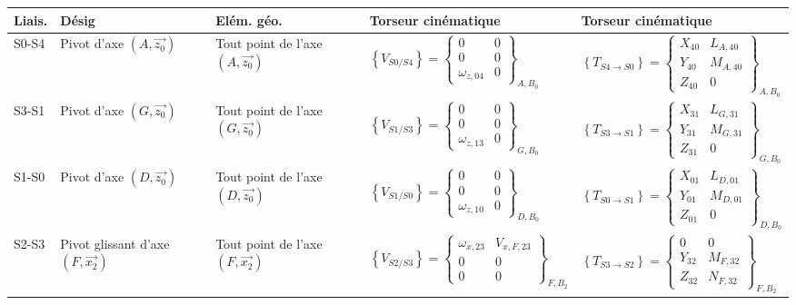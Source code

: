 {\begin{center}
\begin{tabular}{|m{0.5cm}|m{1.7cm}|m{2cm}|m{5.8cm}|m{5.5cm}|}
\hline
\end{tabular}
\end{center}}{\begin{center}
\begin{tabular}{|m{0.5cm}|m{1.7cm}|m{2cm}|m{5.8cm}|m{5.5cm}|}
\hline
Liais. & Désig & Elém. géo. & Torseur cinématique & Torseur cinématique \\ 
\hline
S0-S4 & Pivot d'axe $(A,\vec{z_0})$ & Tout point de l'axe  $(A,\vec{z_0})$ & \small$\left\{V_{S0/S4}\right\}=\left\{\begin{array}{cc}0 & 0\\0&0\\\omega_{z,04}&0\end{array}\right\}_{A,B_0}$ & \small$\left\{T_{S4\rightarrow S0}\right\}=\left\{\begin{array}{cc}X_{40} & L_{A,40}\\Y_{40}&M_{A,40}\\Z_{40}&0\end{array}\right\}_{A,B_0}$\\
\hline
S3-S1 & Pivot d'axe $(G,\vec{z_0})$ & Tout point de l'axe  $(G,\vec{z_0})$ & \small$\left\{V_{S1/S3}\right\}=\left\{\begin{array}{cc}0 & 0\\0&0\\\omega_{z,13}&0\end{array}\right\}_{G,B_0}$ & \small$\left\{T_{S3\rightarrow S1}\right\}=\left\{\begin{array}{cc}X_{31} & L_{G,31}\\Y_{31}&M_{G,31}\\Z_{31}&0\end{array}\right\}_{G,B_0}$\\
\hline
S1-S0 & Pivot d'axe $(D,\vec{z_0})$ & Tout point de l'axe  $(D,\vec{z_0})$ & \small$\left\{V_{S1/S0}\right\}=\left\{\begin{array}{cc}0 & 0\\0&0\\\omega_{z,10}&0\end{array}\right\}_{D,B_0}$ & \small$\left\{T_{S0\rightarrow S1}\right\}=\left\{\begin{array}{cc}X_{01} & L_{D,01}\\Y_{01}&M_{D,01}\\Z_{01}&0\end{array}\right\}_{D,B_0}$\\
\hline
S2-S3 & Pivot glissant d'axe $(F,\vec{x_2})$ & Tout point de l'axe  $(F,\vec{x_2})$ & \small$\left\{V_{S2/S3}\right\}=\left\{\begin{array}{cc}\omega_{x,23} & V_{x,F,23}\\0&0\\0&0\end{array}\right\}_{F,B_2}$ & \small$\left\{T_{S3\rightarrow S2}\right\}=\left\{\begin{array}{cc}0 & 0\\Y_{32}&M_{F,32}\\Z_{32}&N_{F,32}\end{array}\right\}_{F,B_2}$\\

\end{tabular}
\end{center}}
